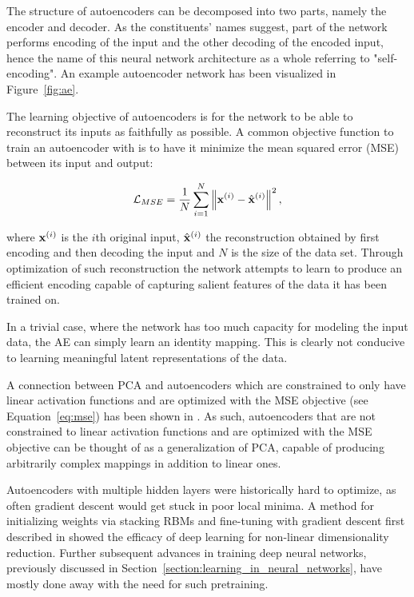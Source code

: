 The structure of autoencoders can be decomposed into two parts, namely the encoder and decoder. As the constituents' names suggest, part of the network performs encoding of the input and the other decoding of the encoded input, hence the name of this neural network architecture as a whole referring to "self-encoding". An example autoencoder network has been visualized in Figure~\ref{fig:ae}.

The learning objective of autoencoders is for the network to be able to reconstruct its inputs as faithfully as possible. A common objective function to train an autoencoder with is to have it minimize the mean squared error (MSE) between its input and output:

\begin{equation}
  \mathcal{L}_{MSE} = \frac{1}{N} \sum_{i=1}^{N} \left\lVert\mathbf{x}^{(i)} - \hat{\mathbf{x}}^{(i)}\right\rVert^2,
  \label{eq:mse}
\end{equation}

where $\mathbf{x}^{(i)}$ is the $i$th original input, $\hat{\mathbf{x}}^{(i)}$ the reconstruction obtained by first encoding and then decoding the input and $N$ is the size of the data set. Through optimization of such reconstruction the network attempts to learn to produce an efficient encoding capable of capturing salient features of the data it has been trained on.

In a trivial case, where the network has too much capacity for modeling the input data, the AE can simply learn an identity mapping. This is clearly not conducive to learning meaningful latent representations of the data.


A connection between PCA and autoencoders which are constrained to only have linear activation functions and are optimized with the MSE objective (see Equation~\ref{eq:mse}) has been shown in \cite{autoencoder_pca}. As such, autoencoders that are not constrained to linear activation functions and are optimized with the MSE objective can be thought of as a generalization of PCA, capable of producing arbitrarily complex mappings in addition to linear ones.

Autoencoders with multiple hidden layers were historically hard to optimize, as often gradient descent would get stuck in poor local minima. A method for initializing weights via stacking RBMs and fine-tuning with gradient descent first described in \cite{hinton_autoencoder} showed the efficacy of deep learning for non-linear dimensionality reduction. Further subsequent advances in training deep neural networks, previously discussed in Section~\ref{section:learning_in_neural_networks}, have mostly done away with the need for such pretraining.

